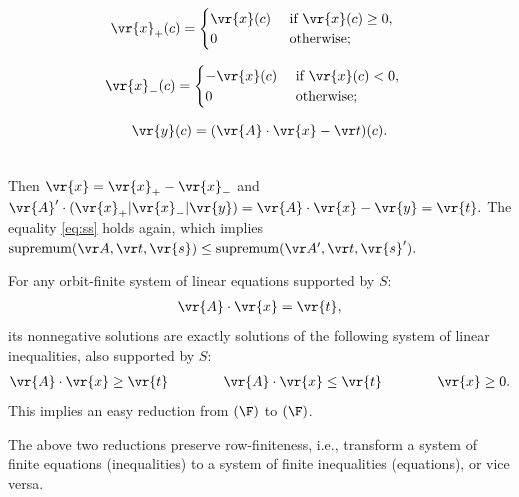 \begin{minipage}{0.35\linewidth}
\begin{align*}
\vr{x}_+(c) & =
\begin{cases}
\vr{x}(c) & \text{ if }\vr{x}(c) \geq 0, \\
0         & \text{ otherwise;}
\end{cases} 
\end{align*}
\end{minipage}
\begin{minipage}{0.35\linewidth}
\begin{align*}
\vr{x}_-(c) & =
\begin{cases}
-\vr{x}(c) & \text{ if }\vr{x}(c) < 0, \\
0         & \text{ otherwise;}
\end{cases} 
\end{align*}
\end{minipage}
\begin{minipage}{0.3\linewidth}
\begin{align*}
\vr{y}(c) & = (\vr{A}\cdot \vr{x} - \vr t)(c). \\
\ 
\end{align*}
\end{minipage}
%
\smallskip

\noindent
Then $\vr{x} = \vr{x}_+ - \vr{x}_-$ and
$
\vr{A}' \cdot (\vr{x}_+ \rvert \vr{x}_- \rvert \vr{y}) =
\vr{A} \cdot \vr{x} - \vr{y} = \vr{t}.
$
The equality \eqref{eq:ss} holds again,
which implies 
$
\textnormal{supremum}(\vr A, \vr t, \vr{s})
\leq
\textnormal{supremum}(\vr A', \vr t, \vr{s}').
$

%
For any orbit-finite system of linear equations supported by $S$:
%
\begin{align*}%
\vr{A} \cdot \vr{x} = \vr{t},
\end{align*}
%
its nonnegative solutions are exactly solutions of the following system of linear inequalities, also supported by $S$:
\begin{align*}%
\vr{A} \cdot \vr{x} \geq \vr{t} \qquad\qquad 
\vr{A} \cdot \vr{x} \leq \vr{t} \qquad\qquad 
\vr{x} \geq 0.
\end{align*}
%
This implies an easy reduction from \nonnegmaxname$(\F)$ to \ineqmaxname$(\F)$.

\begin{slremark}
The above two reductions preserve row-finiteness, i.e., transform a system of finite equations (inequalities) to a system of finite inequalities (equations), or vice versa.
\end{slremark}

